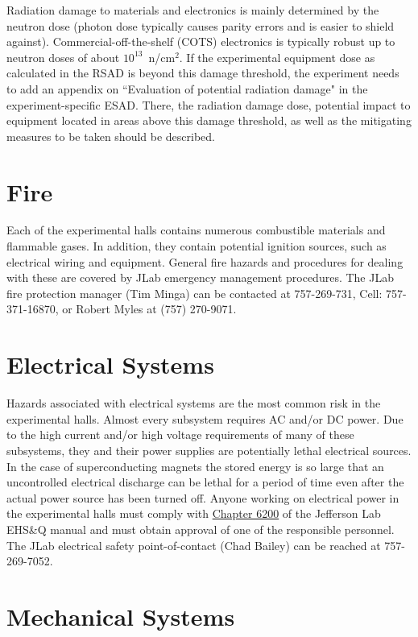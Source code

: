 \documentclass[12pt]{report}
\begin{document}
Radiation damage to materials and electronics is mainly determined by the neutron 
dose (photon dose typically causes parity errors and is easier to shield against). 
Commercial-off-the-shelf (COTS) electronics is typically robust up to neutron doses of 
about $10^{13}$~n/cm$^2$. If the experimental equipment dose as calculated in the RSAD 
is beyond this damage threshold, the experiment needs to add an appendix on ``Evaluation 
of potential radiation damage" in the experiment-specific ESAD. There, the radiation 
damage dose, potential impact to equipment located in areas above this damage threshold, 
as well as the mitigating measures to be taken should be described.

\section{Fire}

Each of the experimental halls contains numerous combustible materials and flammable gases. 
In addition, they contain potential ignition sources, such as electrical wiring and equipment. 
General fire hazards and procedures for dealing with these are covered by JLab emergency 
management procedures. The JLab fire protection manager (Tim Minga) can be contacted at 
757-269-731, Cell: 757-371-16870, or Robert Myles at (757) 270-9071.

\section{Electrical Systems}

Hazards associated with electrical systems are the most common risk in the experimental 
halls. Almost every subsystem requires AC and/or DC power. Due to the high current and/or 
high voltage requirements of many of these subsystems, they and their power supplies are 
potentially lethal electrical sources. In the case of superconducting magnets the stored 
energy is so large that an uncontrolled electrical discharge can be lethal for a period of 
time even after the actual power source has been turned off. Anyone working on electrical 
power in the experimental halls must comply with 
\href{http://www.jlab.org/ehs/ehsmanual/manual/6200.html}{Chapter 6200} of the Jefferson Lab 
EHS\&Q manual and must obtain approval of one of the responsible personnel. The JLab 
electrical safety point-of-contact (Chad Bailey) can be reached at 757-269-7052.

\section{Mechanical Systems}
\end{document}
